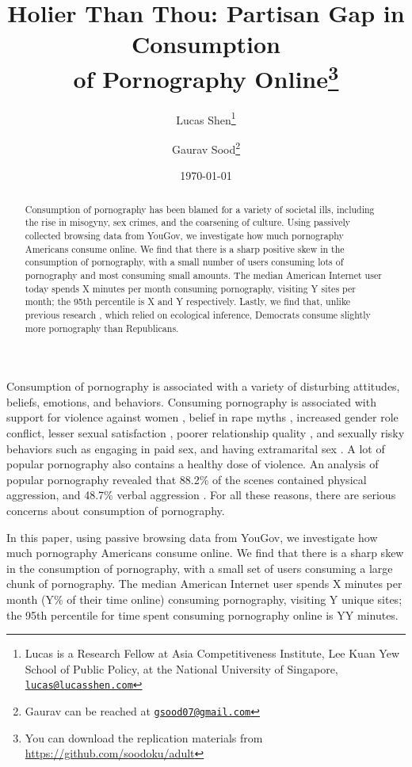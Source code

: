 \documentclass[12pt, letterpaper]{article}
\title{\Large{Holier Than Thou: Partisan Gap in Consumption\\ of Pornography Online}\footnote{You can download the replication materials from \href{http://github.com/soodoku/adult}{https://github.com/soodoku/adult}}}
\author{Lucas Shen\thanks{Lucas is a Research Fellow at Asia Competitiveness Institute, Lee Kuan Yew School of Public Policy, at the National University of Singapore, \href{mailto:lucas@lucasshen.com}{\footnotesize{\texttt{lucas@lucasshen.com}}}} \and Gaurav Sood\thanks{Gaurav can be reached at \href{mailto:gsood07@gmail.com}{\footnotesize{\texttt{gsood07@gmail.com}}}}\vspace{.5cm}}
\date{\today}
\begin{document}
\maketitle

\begin{abstract}
\noindent Consumption of pornography has been blamed for a variety of societal ills, including the rise in misogyny, sex crimes, and the coarsening of culture. Using passively collected browsing data from YouGov, we investigate how much pornography Americans consume online. We find that there is a sharp positive skew in the consumption of pornography, with a small number of users consuming lots of pornography and most consuming small amounts. The median American Internet user today spends X minutes per month consuming pornography, visiting Y sites per month; the 95th percentile is X and Y respectively. Lastly, we find that, unlike previous research \citep{macinnis2015american, edelman2009markets}, which relied on ecological inference, Democrats consume slightly more pornography than Republicans.
\end{abstract} 
\clearpage
\doublespace

Consumption of pornography is associated with a variety of disturbing attitudes, beliefs, emotions, and behaviors. Consuming pornography is associated with support for violence against women \citep{hald2010pornography, malamuth2012pornography, donnerstein1984pornography}, belief in rape myths \citep{foubert2011pornography}, increased gender role conflict, lesser sexual satisfaction \citep{szymanski2014psychological, stewart2012young}, poorer relationship quality \citep{szymanski2014psychological, szymanski2015male}, and sexually risky behaviors such as engaging in paid sex, and having extramarital sex \citep{wright2012internet}. A lot of popular pornography also contains a healthy dose of violence. An analysis of popular pornography revealed that 88.2\% of the scenes contained physical aggression, and 48.7\% verbal aggression \citep{bridges2010aggression}. For all these reasons, there are serious concerns about consumption of pornography.

In this paper, using passive browsing data from YouGov, we investigate how much pornography Americans consume online. We find that there is a sharp skew in the consumption of pornography, with a small set of users consuming a large chunk of pornography. The median American Internet user spends X minutes per month (Y\% of their time online) consuming pornography, visiting Y unique sites; the 95th percentile for time spent consuming pornography online is YY minutes.
\end{document}
